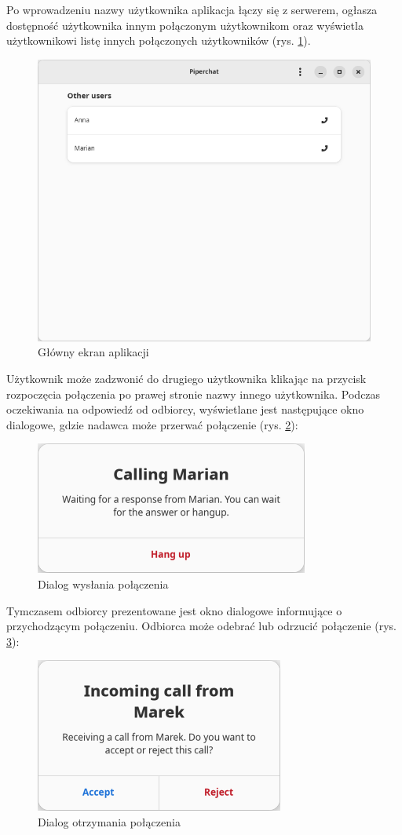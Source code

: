 Po wprowadzeniu nazwy użytkownika aplikacja łączy się z serwerem, ogłasza dostępność użytkownika
innym połączonym użytkownikom oraz wyświetla użytkownikowi listę innych połączonych użytkowników
(rys. \ref{fig:screen_main}).

\begin{figure}[H]
    \centering
    \includegraphics[width=.5\textwidth]{img/gui/screen_main}
    \caption{Główny ekran aplikacji}
    \label{fig:screen_main}
\end{figure}

Użytkownik może zadzwonić do drugiego użytkownika klikając na przycisk rozpoczęcia połączenia po
prawej stronie nazwy innego użytkownika. Podczas oczekiwania na odpowiedź od odbiorcy, wyświetlane
jest następujące okno dialogowe, gdzie nadawca może przerwać połączenie (rys.
\ref{fig:screen_call_start}):

\begin{figure}[H]
    \centering
    \includegraphics[width=.5\textwidth]{img/gui/screen_call_start}
    \caption{Dialog wysłania połączenia}
    \label{fig:screen_call_start}
\end{figure}

Tymczasem odbiorcy prezentowane jest okno dialogowe informujące o przychodzącym połączeniu. Odbiorca
może odebrać lub odrzucić połączenie (rys. \ref{fig:screen_call_recv}):

\begin{figure}[H]
    \centering
    \includegraphics[width=.4\textwidth]{img/gui/screen_call_recv}
    \caption{Dialog otrzymania połączenia}
    \label{fig:screen_call_recv}
\end{figure}

